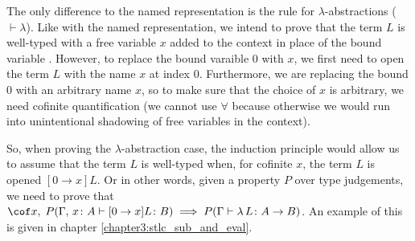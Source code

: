 The only difference to the named representation is the rule for $\lambda$-abstractions
($\vdash\lambda$). Like with the named representation, we intend to prove that the term $L$ is
well-typed with a free variable $x$ added to the context in place of the bound variable
\citep[chapter~Lambda]{wadler_programming_2022}. However, to replace the bound varaible $0$ with
$x$, we first need to open the term $L$ with the name $x$ at index $0$. Furthermore, we are
replacing the bound $0$ with an arbitrary name $x$, so to make sure that the choice of $x$ is
arbitrary, we need cofinite quantification (we cannot use $\forall$ because otherwise we would run
into unintentional shadowing of free variables in the context).

So, when proving the $\lambda$-abstraction case, the induction principle would allow us to assume
that the term $L$ is well-typed when, for cofinite $x$, the term $L$ is opened $[0 \to x] L$. Or in
other words, given a property $P$ over type judgements, we need to prove that $\cof x , \; P(\Gamma
, \, x \colon A \vdash [0 \to x] L \colon B) \implies P(\Gamma \vdash \lambda \, L \colon A \to B)$.
An example of this is given in chapter \ref{chapter3:stlc_sub_and_eval}.
